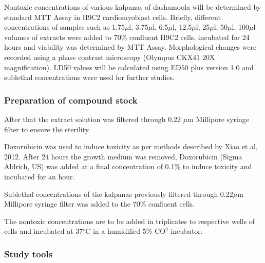 \documentclass[11pt]{article} %
\begin{document}
Nontoxic concentrations of various kalpanas of dashamoola will be determined by standard
MTT Assay in H9C2 cardiomyoblast cells. Briefly, different concentrations of samples such as
1.75$\mu$l, 3.75$\mu$l, 6.5$\mu$l, 12.5$\mu$l, 25$\mu$l, 50$\mu$l, 100$\mu$l volumes of extracts were added to 70\% confluent H9C2 cells, incubated for 24 hours and viability was determined by MTT Assay. Morphological changes were recorded using a phase contrast microscopy (Olympus CKX41 20X magnification). LD50 values will be calculated using ED50 plus version 1.0 and sublethal concentrations were used for further studies.

\subsubsection{ Preparation of compound stock}
\label{subsubsec: Preparation of compound stock}

After that the extract solution was filtered through 0.22 $\mu$m Millipore syringe filter to
ensure the sterility.

Doxorubicin was used to induce toxicity as per methods described by Xiao et al, 2012. After 24
hours the growth medium was removed, Doxorubicin (Sigma Aldrich, US) was added at a final
concentration of 0.1\% to induce toxicity and incubated for an hour.

Sublethal concentrations of the kalpanas previously filtered through 0.22$\mu$m Millipore syringe filter was added to the 70\% confluent cells.

The nontoxic concentrations are to be added in triplicates to respective wells of cells and
incubated at 37$^{\circ}$C in a humidified 5\% CO$ ^{2} $ incubator.

\subsubsection{Study tools}
\label{subsubsec:Study tools}
\end{document}
